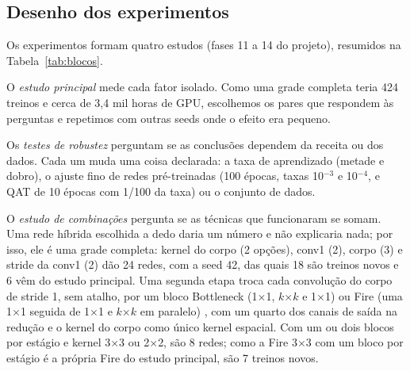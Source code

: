 \documentclass[conference]{IEEEtran}
\newcommand{\by}{\ensuremath{\times}}
\begin{document}
\subsection{Desenho dos experimentos}

Os experimentos formam quatro estudos (fases 11 a 14 do projeto), resumidos na Tabela~\ref{tab:blocos}.

O \textit{estudo principal} mede cada fator isolado. Como uma grade completa teria 424 treinos e cerca de 3,4 mil horas de GPU,
escolhemos os pares que respondem às perguntas e repetimos com outras seeds onde o efeito era pequeno.

Os \textit{testes de robustez} perguntam se as conclusões dependem da receita ou dos dados. Cada um muda uma coisa declarada: a taxa de
aprendizado (metade e dobro), o ajuste fino de redes pré-treinadas (100 épocas, taxas 10$^{-3}$ e 10$^{-4}$, e QAT de 10 épocas com
1/100 da taxa) \cite{li2020rethinking} ou o conjunto de dados.

O \textit{estudo de combinações} pergunta se as técnicas que funcionaram se somam. Uma rede híbrida escolhida a dedo daria um número e
não explicaria nada; por isso, ele é uma grade completa: kernel do corpo (2 opções), conv1 (2), corpo (3) e stride da conv1 (2) dão 24
redes, com a seed 42, das quais 18 são treinos novos e 6 vêm do estudo principal. Uma segunda etapa troca cada convolução do corpo de
stride 1, sem atalho, por um bloco Bottleneck (1\by1, $k$\by$k$ e 1\by1) \cite{he2016deep} ou Fire (uma 1\by1 seguida de 1\by1 e
$k$\by$k$ em paralelo) \cite{iandola2016squeezenet}, com um quarto dos canais de saída na redução e o kernel do corpo como único kernel
espacial. Com um ou dois blocos por estágio e kernel 3\by3 ou 2\by2, são 8 redes; como a Fire 3\by3 com um bloco por estágio é a
própria Fire do estudo principal, são 7 treinos novos.
\end{document}
